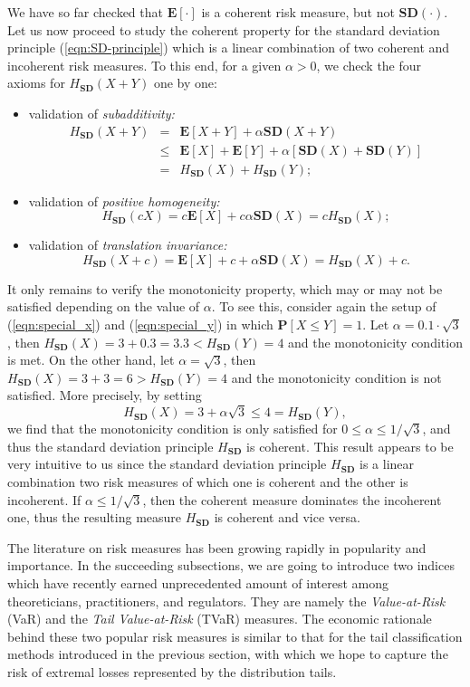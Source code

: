 \documentclass[12pt]{article}
\begin{document}
We have so far checked that $\mathbf{E}[\cdot]$ is a coherent risk measure, but not $\mathbf{SD}(\cdot)$.  Let us now proceed to study the coherent property for the standard deviation principle (\ref{eqn:SD-principle}) which is a linear combination of two coherent and incoherent risk measures.  To this end, for a given $\alpha>0$, we check the four axioms for $H_{\mathbf{SD}}(X+Y)$ one by one:
\begin{itemize}
  \item validation of \textit{subadditivity:}
\begin{eqnarray*}
  H_{\mathbf{SD}}(X+Y) &=& \mathbf{E}[X+Y]+\alpha \mathbf{SD}(X+Y) \\
  &\leq& \mathbf{E}[X]+\mathbf{E}[Y]+\alpha [\mathbf{SD}(X) +\mathbf{SD}(Y)]\\
  &=& H_{\mathbf{SD}}(X)+ H_{\mathbf{SD}}(Y);
\end{eqnarray*}
\item validation of \textit{positive homogeneity:}
\[
H_{\mathbf{SD}}(cX)=c\mathbf{E}[X]+c\alpha\mathbf{SD}(X)=cH_{\mathbf{SD}}(X);
\]
\item validation of \textit{translation invariance:}
\[
H_{\mathbf{SD}}(X+c)=\mathbf{E}[X]+c+\alpha\mathbf{SD}(X)=H_{\mathbf{SD}}(X)+c.
\]
\end{itemize}
It only remains to verify the monotonicity property, which may or may not be satisfied depending on the value of $\alpha$.  To see this, consider again the setup of (\ref{eqn:special_x}) and (\ref{eqn:special_y}) in which $\mathbf{P}[X\leq Y]=1$.  Let $\alpha=0.1\cdot \sqrt{3}$, then $H_{\mathbf{SD}}(X)=3+0.3=3.3< H_{\mathbf{SD}}(Y)=4$ and the monotonicity condition is met.  On the other hand, let $\alpha=\sqrt{3}$, then $H_{\mathbf{SD}}(X)=3+3=6> H_{\mathbf{SD}}(Y)=4$ and the monotonicity condition is not satisfied. More precisely, by setting
\[
  H_{\mathbf{SD}}(X) = 3+\alpha\sqrt{3}
\leq4= H_{\mathbf{SD}}(Y),
\]
we find that the monotonicity condition is only satisfied for $0\leq\alpha\leq 1/\sqrt{3}$, and thus the standard deviation principle $H_{\mathbf{SD}}$ is coherent.  This result appears to be very intuitive to us since the standard deviation principle $H_{\mathbf{SD}}$ is a linear combination two risk measures of which one is coherent and the other is incoherent.  If $\alpha\leq 1/\sqrt{3}$, then the coherent measure dominates the incoherent one, thus the resulting measure $H_{\mathbf{SD}}$ is coherent and vice versa.

The literature on risk measures has been growing rapidly in popularity and importance. In the succeeding subsections, we are going to introduce two indices which have recently earned unprecedented amount of interest among theoreticians, practitioners, and regulators.  They are namely the \textit{Value-at-Risk} (VaR) and the \textit{Tail Value-at-Risk} (TVaR) measures.  The economic rationale behind these two popular risk measures is similar to that for the tail classification methods introduced in the previous section, with which we hope to capture the risk of extremal losses represented by the distribution tails.
\end{document}
